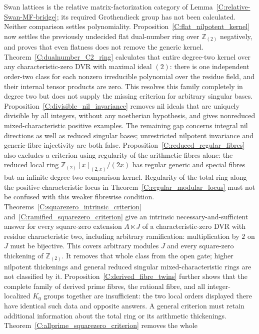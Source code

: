 \begin{remark}
Swan lattices is the relative matrix-factorization category of
Lemma~\ref{C:relative-Swan-MF-bridge}; its required Grothendieck group
has not been calculated. Neither comparison settles polynomiality.
Proposition~\ref{C:flat_nilpotent_kernel} now settles the previously
undecided flat dual-number ring over $\mathbb Z_{(2)}$ negatively,
and proves that even flatness does not remove the generic kernel.
Theorem~\ref{C:dualnumber_C2_ring} calculates that entire degree-two
kernel over any characteristic-zero DVR with maximal ideal $(2)$:
there is one independent order-two class for each nonzero irreducible
polynomial over the residue field, and their internal tensor products
are zero. This resolves this family completely in degree two but
does not supply the missing criterion for arbitrary singular bases.
Proposition~\ref{C:divisible_nil_invariance} removes nil ideals
that are uniquely divisible by all integers, without any noetherian
hypothesis, and gives nonreduced mixed-characteristic positive examples.
The remaining gap concerns integral nil directions as well as reduced
singular bases; unrestricted nilpotent invariance and generic-fibre
injectivity are both false.
Proposition~\ref{C:reduced_regular_fibres} also excludes a criterion
using regularity of the arithmetic fibres alone: the reduced local
ring $\mathbb Z_{(2)}[x]_{(2,x)}/(2x)$ has regular generic and special
fibres but an infinite degree-two comparison kernel. Regularity of
the total ring along the positive-characteristic locus in
Theorem~\ref{C:regular_modular_locus} must not be confused with this
weaker fibrewise condition.
Theorems~\ref{C:squarezero_intrinsic_criterion}
and~\ref{C:ramified_squarezero_criterion} give an intrinsic
necessary-and-sufficient answer for every square-zero extension
$A\ltimes J$ of a characteristic-zero DVR with residue characteristic
two, including arbitrary ramification: multiplication
by $2$ on $J$ must be bijective. This covers arbitrary modules $J$
and every square-zero thickening of $\mathbb Z_{(2)}$.
It removes that whole class from the open gate; higher nilpotent
thickenings and general reduced singular mixed-characteristic
rings are not classified by it.
Proposition~\ref{C:derived_fibre_twins} further shows that the
complete family of derived prime fibres, the rational fibre, and
all integer-localized $K_0$ groups together are insufficient: the
two local orders displayed there have identical such data and
opposite answers. A general criterion must retain additional
information about the total ring or its arithmetic thickenings.
Theorem~\ref{C:allprime_squarezero_criterion} removes the whole

\end{remark}

